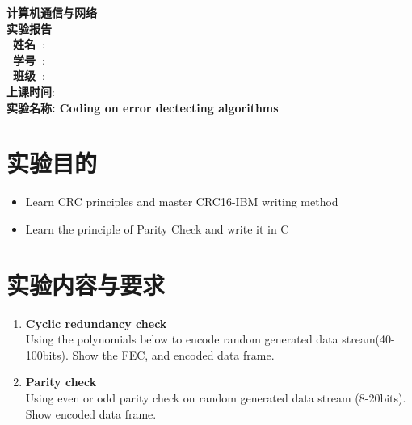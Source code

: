 \documentclass[a4paper]{ctexart}
\begin{document}
  \begin{titlepage}
      \songti
      \begin{center}
        \vspace*{2cm}
        {\fontsize{24pt}{0}
          \textbf{计算机通信与网络\\实验报告\\}
        }
        \vspace*{10cm}
        {\fontsize{16pt}{0}
          \textbf{\ 姓\quad 名\ }: \underline{}\\
          \textbf{\ 学\quad 号\ }: \underline{}\\
          \textbf{\ 班\quad 级\ }: \underline{}\\
          \textbf{上课时间}: \underline{}\\
        }
        \vspace*{7cm}
        {\fontsize{16pt}{0}
          \textbf{实验名称: {\Large Coding on error dectecting algorithms}}
        }
      \end{center}
  \end{titlepage}


  \newpage
  \section{实验目的}
    \begin{itemize}
      \item Learn CRC principles and master CRC16-IBM writing method
      \item Learn the principle of Parity Check and write it in C
    \end{itemize}

  \section{实验内容与要求}
    \begin{enumerate}
      \item \textbf{Cyclic redundancy check\\}
      Using the polynomials below to encode random generated data stream(40-100bits).
      Show the FEC, and encoded data frame.
      \item \textbf{Parity check\\}
      Using even or odd parity check on random generated data stream (8-20bits).
      Show encoded data frame.
    \end{enumerate}
\end{document}
